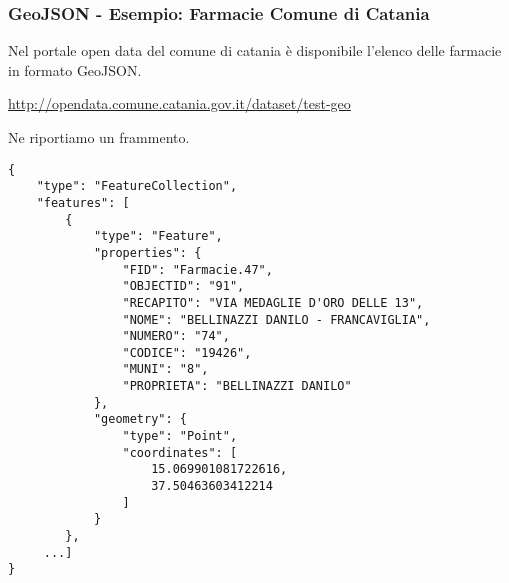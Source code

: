 \documentclass[8pt]{beamer}
\begin{document}
\begin{frame}[fragile]
 \frametitle{GeoJSON - Esempio: Farmacie Comune di Catania}
 Nel portale open data del comune di catania \`e disponibile l'elenco delle farmacie
 in formato GeoJSON.

\begin{center}
 \begin{small}
  \url{http://opendata.comune.catania.gov.it/dataset/test-geo}
\end{small} 
\end{center}
 
Ne riportiamo un frammento. 
\begin{small}
\begin{verbatim}
{
    "type": "FeatureCollection",
    "features": [
        {
            "type": "Feature",
            "properties": {
                "FID": "Farmacie.47",
                "OBJECTID": "91",
                "RECAPITO": "VIA MEDAGLIE D'ORO DELLE 13",
                "NOME": "BELLINAZZI DANILO - FRANCAVIGLIA",
                "NUMERO": "74",
                "CODICE": "19426",
                "MUNI": "8",
                "PROPRIETA": "BELLINAZZI DANILO"
            },
            "geometry": {
                "type": "Point",
                "coordinates": [
                    15.069901081722616,
                    37.50463603412214
                ]
            }
        },
     ...]
}     
\end{verbatim}
\end{small}
\end{frame}
\end{document}
